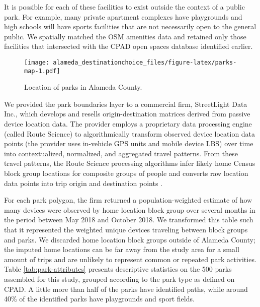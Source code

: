 \documentclass[3p, authoryear, review]{elsarticle} %
\makeatletter
\def\maxwidth{\ifdim\Gin@nat@width>\linewidth\linewidth
\else\Gin@nat@width\fi}
\let\Oldincludegraphics\includegraphics
\renewcommand{\includegraphics}[1]{\Oldincludegraphics[width=\maxwidth]{#1}}
\makeatother
\begin{document}
It is possible for each of these facilities to exist outside the context of
a public park. For example, many private apartment complexes have playgrounds
and high schools will have sports facilities that are not necessarily open to
the general public. We spatially matched the OSM amenities data and retained
only those facilities that intersected with the CPAD open spaces database
identified earlier.

\begin{figure}
\centering
\texttt{[image: alameda\_destinationchoice\_files/figure-latex/parks-map-1.pdf]}
\caption{\label{fig:parks-map}Location of parks in Alameda County.}
\end{figure}

We provided the park boundaries layer to a commercial firm, StreetLight Data
Inc., which develops and resells origin-destination matrices derived from
passive device location data. The provider employs a proprietary data processing
engine (called Route Science) to algorithmically transform observed device
location data points (the provider uses in-vehicle GPS units and mobile device
LBS) over time into contextualized, normalized, and aggregated travel patterns.
From these travel patterns, the Route Science processing algorithms infer likely
home Census block group locations for composite groups of people and converts
raw location data points into trip origin and destination points \citep{Pan2006, Friedrich2010}.

For each park polygon, the firm returned a population-weighted estimate of how
many devices were observed by home location block group over several months in
the period between May 2018 and October 2018. We transformed this table such
that it represented the weighted unique devices traveling between block groups
and parks. We discarded home location block groups outside of Alameda County;
the imputed home locations can be far away from the study area for a small
amount of trips and are unlikely to represent common or repeated park
activities. Table \ref{tab:park-attributes} presents descriptive statistics
on the 500 parks assembled for this study, grouped according to the
park type as defined on CPAD. A little more than half of the parks have
identified paths, while around 40\% of the identified parks have playgrounds and
sport fields.
\end{document}
